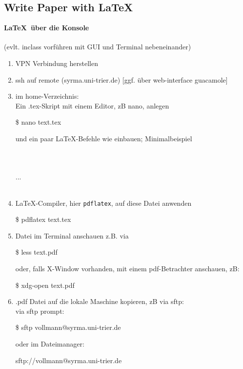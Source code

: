 \subsection{Write Paper with \LaTeX}

	
 \textbf{\LaTeX~über die Konsole}\\
	~\\
	(evlt. inclass vorführen mit GUI und Terminal nebeneinander)
	\begin{enumerate}
		\item VPN Verbindung herstellen
		\item ssh auf remote (syrma.uni-trier.de) [ggf. über web-interface guacamole]
		\item im home-Verzeichnis:\\
		Ein .tex-Skript mit einem Editor, zB nano, anlegen\
		
			\$ nano text.tex
		
		und ein paar \LaTeX-Befehle wie  einbauen; Minimalbeispiel\\[0.1cm]
		\hspace*{0.5cm}\\
		\hspace*{0.5cm}\\
		\hspace*{0.5cm}\\
		\hspace*{0.5cm}\hspace*{0.5cm}...\\
		\hspace*{0.5cm}\\
		\item \LaTeX-Compiler, hier \texttt{pdflatex}, auf diese Datei anwenden
		
			\$ pdflatex text.tex
		
		\item Datei im Terminal anschauen z.B. via
		
			\$ less text.pdf
		
		oder, falls X-Window vorhanden, mit einem pdf-Betrachter anschauen, zB:
		
			\$ xdg-open text.pdf
		
		\item .pdf Datei auf die lokale Maschine kopieren, zB via sftp:\\
		via sftp prompt:
		
			\$ sftp vollmann@syrma.uni-trier.de
			
		oder im Dateimanager:
		
			sftp://vollmann@syrma.uni-trier.de
		
	\end{enumerate}



